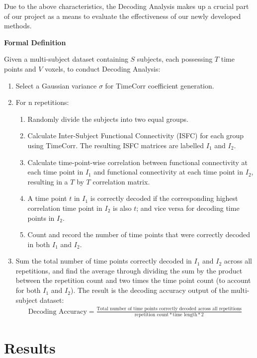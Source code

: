 \documentclass[11pt]{article}
\begin{document}
Due to the above characteristics, the Decoding Analysis makes up a crucial part of our project as a means to evaluate the effectiveness of our newly developed methods.

\large{\textbf{Formal Definition}}

\normalsize
Given a multi-subject dataset containing $S$ subjects, each possessing $T$ time points and $V$ voxels, to conduct Decoding Analysis:
\begin{enumerate}
\item Select a Gaussian variance $\sigma$ for TimeCorr coefficient generation.
\item For n repetitions:
\begin{enumerate}
\item Randomly divide the subjects into two equal groups.
\item Calculate Inter-Subject Functional Connectivity (ISFC) for each group using TimeCorr. The resulting ISFC matrices are labelled $I_1$ and $I_2$.
\item Calculate time-point-wise correlation between functional connectivity at each time point in $I_1$ and functional connectivity at each time point in $I_2$, resulting in a $T$ by $T$ correlation matrix.
\item A time point $t$ in $I_1$ is correctly decoded if the corresponding highest correlation time point in $I_2$ is also $t$; and vice versa for decoding time points in $I_2$.
\item Count and record the number of time points that were correctly decoded in both $I_1$ and $I_2$.
\end{enumerate}
\item Sum the total number of time points correctly decoded in $I_1$ and $I_2$ across all repetitions, and find the average through dividing the sum by the product between the repetition count and two times the time point count (to account for both $I_1$ and $I_2$). The result is the decoding accuracy output of the multi-subject dataset:
\begin{align*}
\text{Decoding Accuracy} = \frac{\text{Total number of time points correctly decoded across all repetitions}}{\text{repetition count} * \text{time length} * 2}
\end{align*}
\end{enumerate}

\newpage
\section{Results}
\end{document}
